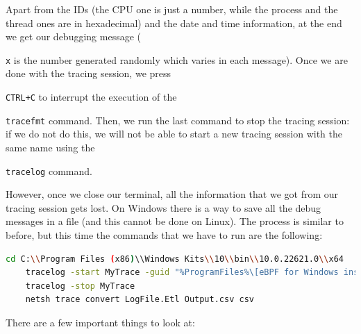 Apart from the IDs (the CPU one is just a number, while the process and the thread ones are in hexadecimal) and the date and time information, at the end we get our debugging message (\raggedright\colorbox{backcolour}{\lstinline[style=commandline, language=bash]|x|} is the number generated randomly which varies in each message).
Once we are done with the tracing session, we press \raggedright\colorbox{backcolour}{\lstinline[style=commandline, language=bash]|CTRL+C|} to interrupt the execution of the \raggedright\colorbox{backcolour}{\lstinline[style=commandline, language=bash]|tracefmt|} command.
Then, we run the last command to stop the tracing session: if we do not do this, we will not be able to start a new tracing session with the same name using the \raggedright\colorbox{backcolour}{\lstinline[style=commandline, language=bash]|tracelog|} command.

However, once we close our terminal, all the information that we got from our tracing session gets lost.
On Windows there is a way to save all the debug messages in a file (and this cannot be done on Linux).
The process is similar to before, but this time the commands that we have to run are the following:

\begin{lstlisting}[style=commandline, language=bash, caption={Commands for kernel debugging using \colorbox{backcolour}{\lstinline[style=commandline, language=bash]|tracelog|}.}]
	cd C:\\Program Files (x86)\\Windows Kits\\10\\bin\\10.0.22621.0\\x64
	tracelog -start MyTrace -guid "%ProgramFiles%\[eBPF for Windows install folder]\ebpf-printk.guid" -kd
	tracelog -stop MyTrace
	netsh trace convert LogFile.Etl Output.csv csv
\end{lstlisting}

There are a few important things to look at:

